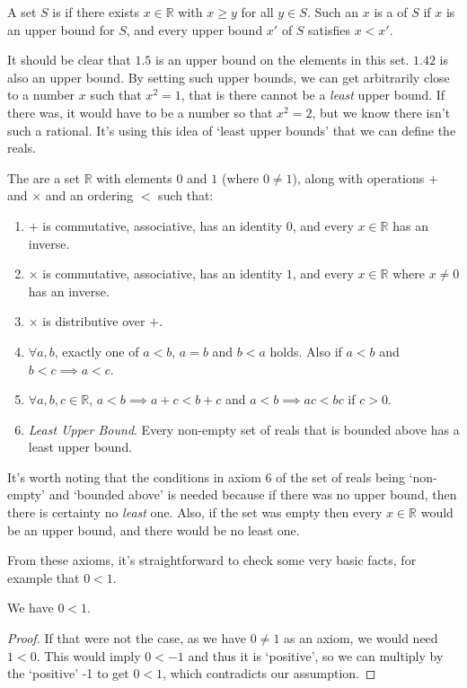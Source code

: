 \documentclass[a4paper]{scrartcl}
\begin{document}
\begin{definition}
	A set $S$ is  if there exists $x \in \mathbb{R}$ with $x \geq y$ for all $y \in S$. Such an $x$ is a  of $S$ if $x$ is an upper bound for $S$, and every upper bound $x'$ of $S$ satisfies $x < x'$. 
\end{definition}

It should be clear that $1.5$ is an upper bound on the elements in this set. $1.42$ is also an upper bound. By setting such upper bounds, we can get arbitrarily close to a number $x$ such that $x^2 = 1$, that is there cannot be a \emph{least} upper bound. If there was, it would have to be a number so that $x^2 = 2$, but we know there isn't such a rational. 
It's using this idea of `least upper bounds' that we can define the reals.

\begin{definition}
	The  are a set $\mathbb{R}$ with elements $0$ and $1$ (where $0 \neq 1$), along with operations $+$ and $\times$ and an ordering $<$ such that:
	\begin{enumerate}
		\item $+$ is commutative, associative, has an identity $0$, and every $x \in \mathbb{R}$ has an inverse.
		\item $\times$ is commutative, associative, has an identity $1$, and every $x \in \mathbb{R}$ where $x \neq 0$ has an inverse.
		\item $\times$ is distributive over $+$.
		\item $\forall a, b$, exactly one of $a < b$, $a = b$ and $b < a$ holds. Also if $a < b$ and $b < c \implies a < c$.
		\item $\forall a, b, c \in \mathbb{R}$, $a < b \implies a + c < b + c$ and $a < b \implies ac < bc$ if $c > 0$.
		\item \emph{Least Upper Bound}. Every non-empty set of reals that is bounded above has a least upper bound.
	\end{enumerate}
\end{definition}

It's worth noting that the conditions in axiom 6 of the set of reals being `non-empty' and `bounded above' is needed because if there was no upper bound, then there is certainty no \emph{least} one. Also, if the set was empty then every $x \in \mathbb{R}$ would be an upper bound, and there would be no least one.

From these axioms, it's straightforward to check some very basic facts, for example that $0 < 1$.
\begin{example}
	We have $0 < 1$.
\end{example}
\begin{proof}
	If that were not the case, as we have $0 \neq 1$ as an axiom, we would need $1 < 0$. 
	This would imply $0 < -1$ and thus it is `positive', 
	so we can multiply by the `positive' -1 to get $0 < 1$, which contradicts our assumption.
\end{proof}
\end{document}

